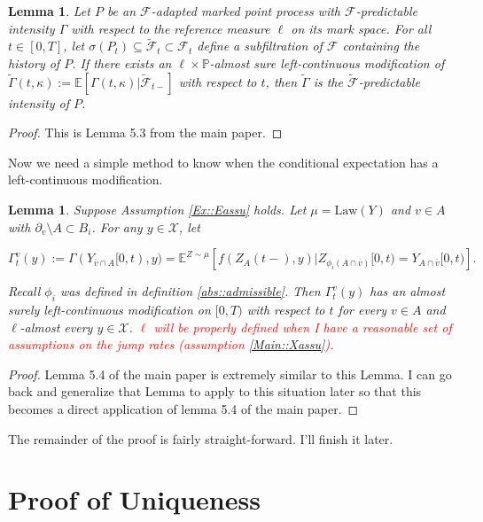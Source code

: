 \documentclass[12pt]{article}
\newcommand{\mb}{\mathbb}
\newcommand{\mc}{\mathcal}
\newcommand{\ov}{\overline}
\newcommand{\te}{\text}
\newcommand{\tr}{\textcolor{red}}
\newcommand{\pr}{\mb{P}}							%
\newcommand{\ex}[1]{\mb{E}\left[#1\right]}			%
\newcommand{\exmu}[2]{\mb{E}^{#1}\left[#2\right]}	%
\newcommand{\vcomp}[1]{_{#1}}						%
\newcommand{\tme}[1]{(#1)}							%
\newcommand{\tmi}[1]{#1}							%
\newcommand{\stte}{\mc{X}}							%
\newcommand{\neigh}[1]{\partial_{#1}}
\newcommand{\cl}[1]{\ov{#1}}
\renewcommand{\mark}{\kappa}
\newcommand{\Xg}{Y}
\newcommand{\ratee}{\Gamma}
\newcommand{\rp}{P}
\newcommand{\F}{\mc{F}}
\newcommand{\alt}[1]{\tilde{#1}}
\newcommand{\cratee}{\alt{\ratee}}
\newcommand{\law}{\te{Law}}
\newcommand{\Xh}{Z}
\newtheorem{lem}[thms]{Lemma}
\begin{document}
\begin{lem}
Let \(\rp\) be an \(\F\)-adapted marked point process with \(\F\)-predictable intensity \(\ratee\) with respect to the reference measure \(\ell\) on its mark space. For all \(t \in [0,T]\), let \(\sigma(\rp_{t}) \subseteq \alt{\F}_{t}\subset \F_{t}\) define a subfiltration of \(\F\) containing the history of \(\rp\). If there exists an \(\ell\times \pr\)-almost sure left-continuous modification of \(\cratee(t,\mark) := \ex{\ratee(t,\mark)|\alt{\F}_{t-}}\) with respect to \(t\), then \(\cratee\) is the \(\alt{\F}\)-predictable intensity of \(\rp\).
\label{Ex::filtering}
\end{lem}

\begin{proof}
This is Lemma 5.3 from the main paper.
\end{proof}

Now we need a simple method to know when the conditional expectation has a left-continuous modification.


\begin{lem}
Suppose Assumption \ref{Ex::Eassu} holds. Let \(\mu = \law(\Xg)\) and \(v \in A\) with \(\neigh{v}\setminus A \subset B_i\). For any \(y \in \stte\), let

\[\ratee^{v}_{t}(y) := \ratee(\Xg\vcomp{\cl{v}\cap A}\tmi{[0,t)},y) = \exmu{\Xh\sim \mu}{f(\Xh\vcomp{A}\tme{t-},y)|\Xh\vcomp{\phi_i(A\cap\cl{v})}\tmi{[0,t)} = \Xg\vcomp{A\cap\cl{v}}\tmi{[0,t)}}.\]

Recall \(\phi_i\) was defined in definition \ref{abs::admissible}. Then \(\ratee^{v}_{t}(y)\) has an almost surely left-continuous modification on \([0,T)\) with respect to \(t\) for every \(v \in A\) and \(\ell\)-almost every \(y \in \stte\). \tr{\(\ell\) will be properly defined when I have a reasonable set of assumptions on the jump rates (assumption \ref{Main::Xassu})}.
\label{Ex::leftmod}
\end{lem}
\begin{proof}
Lemma 5.4 of the main paper is extremely similar to this Lemma. I can go back and generalize that Lemma to apply to this situation later so that this becomes a direct application of lemma 5.4 of the main paper.
\end{proof}
The remainder of the proof is fairly straight-forward. I'll finish it later.

\section{Proof of Uniqueness}
\end{document}
